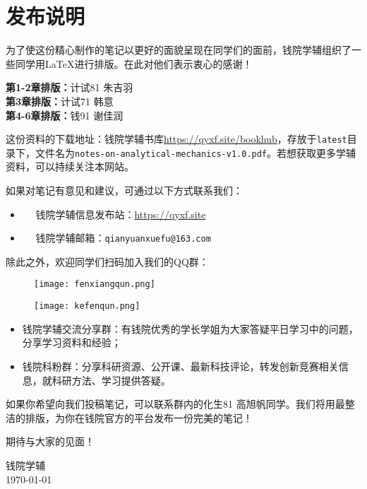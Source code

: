 \chapter*{发布说明}

为了使这份精心制作的笔记以更好的面貌呈现在同学们的面前，钱院学辅组织了一些同学用\LaTeX 进行排版。在此对他们表示衷心的感谢！
\vspace{0.5em}

\begin{tcolorbox}[title={\bfseries 参与排版成员}]
	 \textbf{第1-2章排版：}计试81 朱吉羽\\
	 \textbf{第3章排版：}计试71 韩意\\
	 \textbf{第4-6章排版：}钱91 谢佳润
\end{tcolorbox}

这份资料的下载地址：钱院学辅书库\url{https://qyxf.site/bookhub}，存放于\texttt{latest}目录下，文件名为\texttt{notes-on-analytical-mechanics-v1.0.pdf}。若想获取更多学辅资料，可以持续关注本网站。

如果对笔记有意见和建议，可通过以下方式联系我们：

\begin{itemize}
	\item \faInternetExplorer ~~ 钱院学辅信息发布站：\url{https://qyxf.site}
	\item \faEnvelopeOpen ~~ 钱院学辅邮箱：\texttt{qianyuanxuefu@163.com}
\end{itemize}

除此之外，欢迎同学们扫码加入我们的QQ群：

\begin{figure}[!ht]
	\centering
	\begin{minipage}[c]{0.45\textwidth}
		\centering
		\texttt{[image: fenxiangqun.png]}
	\end{minipage}%
	\quad
	\begin{minipage}[c]{0.45\textwidth}
		\centering
		\texttt{[image: kefenqun.png]}
	\end{minipage}
\end{figure}

\newpage\thispagestyle{empty}

\begin{itemize}
	\item 钱院学辅交流分享群：有钱院优秀的学长学姐为大家答疑平日学习中的问题，分享学习资料和经验；
	\item 钱院科粉群：分享科研资源、公开课、最新科技评论，转发创新竞赛相关信息，就科研方法、学习提供答疑。
\end{itemize}

如果你希望向我们投稿笔记，可以联系群内的化生81 高旭帆同学。我们将用最整洁的排版，为你在钱院官方的平台发布一份完美的笔记！

期待与大家的见面！

\begin{flushright}
	钱院学辅\\
	\today
\end{flushright}

